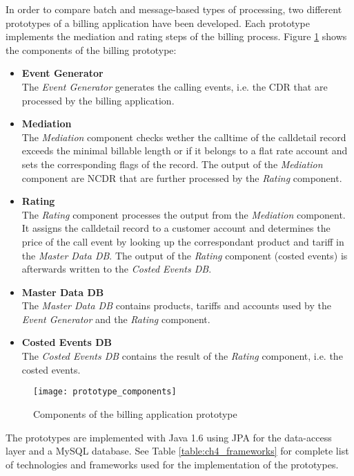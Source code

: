 In order to compare batch and message-based types of processing, two different prototypes of a billing application have been developed. Each prototype implements the mediation and rating steps of the billing process. Figure \ref{fig:ch4_prototype_components} shows the components of the billing prototype: 
\begin{itemize}
	\item \textbf{Event Generator}\\
	The \emph{Event Generator} generates the calling events, i.e. the \ac{CDR} that are processed by the billing application.
	\item \textbf{Mediation}\\
	The \emph{Mediation} component checks wether the calltime of the calldetail record exceeds the minimal billable length or if it belongs to a flat rate account and sets the corresponding flags of the record. The output of the \emph{Mediation} component are \ac{NCDR} that are further processed by the \emph{Rating} component.
	\item \textbf{Rating}\\
	The \emph{Rating} component processes the output from the \emph{Mediation} component. It assigns the calldetail record to a customer account and determines the price of the call event by looking up the correspondant product and tariff in the \emph{Master Data DB}. The output of the \emph{Rating} component (costed events) is afterwards written to the \emph{Costed Events DB}.
	\item \textbf{Master Data DB}\\
	The \emph{Master Data DB} contains products, tariffs and accounts used by the \emph{Event Generator} and the \emph{Rating} component.
	\item \textbf{Costed Events DB}\\
	The \emph{Costed Events DB} contains the result of the \emph{Rating} component, i.e. the costed events.
\end{itemize}

\begin{figure}[htbp]
	\centering
	\texttt{[image: prototype\_components]}
	\caption{Components of the billing application prototype}
	\label{fig:ch4_prototype_components}
\end{figure}

The prototypes are implemented with Java 1.6 using \ac{JPA} for the data-access layer and a MySQL database. See Table \ref{table:ch4_frameworks} for complete list of technologies and frameworks used for the implementation of the prototypes.

